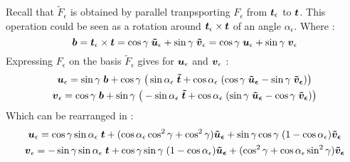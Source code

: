 Recall that $\tilde{F}_\epsilon$ is obtained by parallel tranpsporting $F_\epsilon$ from $\boldsymbol{t}_\epsilon$ to $\boldsymbol{t}$. This operation could be seen as a rotation around $\boldsymbol{t}_\epsilon \times \boldsymbol{t}$ of an angle $\alpha_\epsilon$. Where :
\begin{equation}
	\boldsymbol{b} = \boldsymbol{t}_\epsilon \times \boldsymbol{t}
	 = \cos{\gamma}\;\boldsymbol{\tilde{u}}_\epsilon + \sin{\gamma}\;\boldsymbol{\tilde{v}}_\epsilon
	 = \cos{\gamma}\;\boldsymbol{u}_\epsilon + \sin{\gamma}\;\boldsymbol{v}_\epsilon
\end{equation}
Expressing $F_\epsilon$ on the basis $\tilde{F}_\epsilon$ gives for $\boldsymbol{u}_\epsilon$ and $\boldsymbol{v}_\epsilon$ :
\begin{subequations}
\begin{gather}
		\boldsymbol{u}_\epsilon = \sin{\gamma}\;\boldsymbol{b} + \cos{\gamma}\;\big(\sin{\alpha_\epsilon}\;\boldsymbol{\tilde{t}}
	+ \cos{\alpha_\epsilon}\;(\cos{\gamma}\;\boldsymbol{\tilde{u}_\epsilon}
	- \sin{\gamma}\;\boldsymbol{\tilde{v}_\epsilon})\big)
		\\
		\boldsymbol{v}_\epsilon = \cos{\gamma}\;\boldsymbol{b} + \sin{\gamma}\;\big(-\sin{\alpha_\epsilon}\;\boldsymbol{\tilde{t}}
	+ \cos{\alpha_\epsilon}\;(\sin{\gamma}\;\boldsymbol{\tilde{u}_\epsilon}
	- \cos{\gamma}\;\boldsymbol{\tilde{v}_\epsilon})\big)
\end{gather}
\end{subequations}
Which can be rearranged in :
\begin{subequations}
\begin{gather}
		\boldsymbol{u}_\epsilon = \cos{\gamma}\sin{\alpha_\epsilon}\;\boldsymbol{t}
	+ (\cos{\alpha_\epsilon}\cos^2{\gamma}+ \cos^2{\gamma})\boldsymbol{\tilde{u}_\epsilon}
	+ \sin{\gamma}\cos{\gamma}\;(1-\cos{\alpha_\epsilon})\boldsymbol{\tilde{v}_\epsilon}
		\\
		\boldsymbol{v}_\epsilon = -\sin{\gamma}\sin{\alpha_\epsilon}\;\boldsymbol{t}
	+ \cos{\gamma}\sin{\gamma}\;(1-\cos{\alpha_\epsilon})\boldsymbol{\tilde{u}_\epsilon}
	+ (\cos^2{\gamma} + \cos{\alpha_\epsilon}\sin^2{\gamma})\boldsymbol{\tilde{v}_\epsilon}
\end{gather}
\end{subequations}

